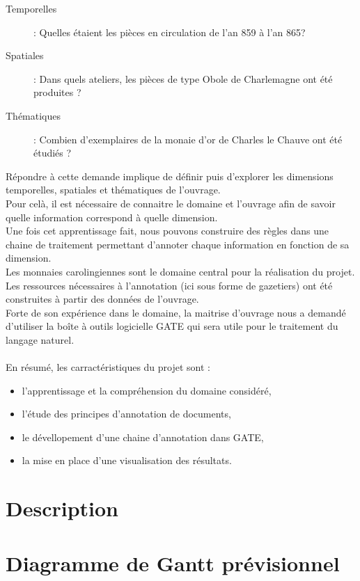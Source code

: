 \documentclass[a4paper, 11pt]{report}
\begin{document}
\begin{description}
\item [Temporelles] : Quelles étaient les pièces en circulation de l'an 859 à l'an 865?
\item [Spatiales] : Dans quels ateliers, les pièces de type Obole de Charlemagne ont été produites ? 
\item [Thématiques] : Combien d'exemplaires de la monaie d'or de Charles le Chauve ont été étudiés ?
\end{description}

Répondre à cette demande implique de définir puis d'explorer les dimensions temporelles, spatiales et thématiques de l'ouvrage.\\
Pour celà, il est nécessaire de connaitre le domaine et l'ouvrage afin de savoir quelle information correspond à quelle dimension.\\
Une fois cet apprentissage fait, nous pouvons construire des règles dans une chaine de traitement permettant d'annoter chaque information en fonction de sa dimension. \\

Les monnaies carolingiennes sont le domaine central pour la réalisation du projet. Les ressources nécessaires à l'annotation (ici sous forme de gazetiers) ont été construites à partir des données de l'ouvrage.\\

Forte de son expérience dans le domaine, la maitrise d'ouvrage nous a demandé d'utiliser la boîte à outils logicielle GATE qui sera utile pour le traitement du langage naturel.\\~\\

En résumé, les carractéristiques du projet sont : 
\begin{itemize}
\item l'apprentissage et la compréhension du domaine considéré,
\item l'étude des principes d'annotation de documents,
\item le dévellopement d'une chaine d'annotation dans GATE,
\item la mise en place d'une visualisation des résultats.
\end{itemize}

	\section{Description}
	\section{Diagramme de Gantt prévisionnel}
\end{document}
